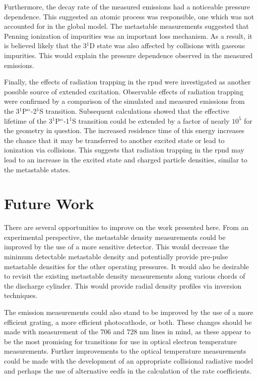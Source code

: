 Furthermore, the decay rate of the measured emissions had a noticeable pressure
dependence. This suggested an atomic process was responsible, one which was not
accounted for in the global model. The metastable measurements suggested that
Penning ionization of impurities was an important loss mechanism. As a result,
it is believed likely that the 3$^1$D state was also affected by collisions with
gaseous impurities. This would explain the pressure dependence observed in the
measured emissions.

Finally, the effects of radiation trapping in the \acs{rpnd} were investigated
as another possible source of extended excitation. Observable effects of
radiation trapping were confirmed by a comparison of the simulated and measured
emissions from the 3$^1$P$^\mathrm{o}$-2$^1$S transition. Subsequent calculations
showed that the effective lifetime of the 3$^1$P$^\mathrm{o}$-1$^1$S transition could
be extended by a factor of nearly $10^5$ for the geometry in question. The
increased residence time of this energy increases the chance that it may be
transferred to another excited state or lead to ionization via collisions.
This suggests that radiation trapping in the \acs{rpnd} may lead to an increase
in the excited state and charged particle densities, similar to the metastable
states.

\section{Future Work}

There are several opportunities to improve on the work presented here. From an
experimental perspective, the metastable density measurements could be improved
by the use of a more sensitive detector. This would decrease the minimum
detectable metastable density and potentially provide pre-pulse metastable
densities for the other operating pressures. It would also be desirable to
revisit the existing metastable density measurements along various chords of the
discharge cylinder. This would provide radial density profiles via inversion
techniques.

The emission measurements could also stand to be improved by the use of a more
efficient grating, a more efficient photocathode, or both. These changes should
be made with measurement of the 706 and 728 nm lines in mind, as these appear to
be the most promising for transitions for use in optical electron temperature
measurements. Further improvements to the optical temperature measurements could
be made with the development of an appropriate collisional radiative model and
perhaps the use of alternative \acs{eedf}s in the calculation of the rate
coefficients.

